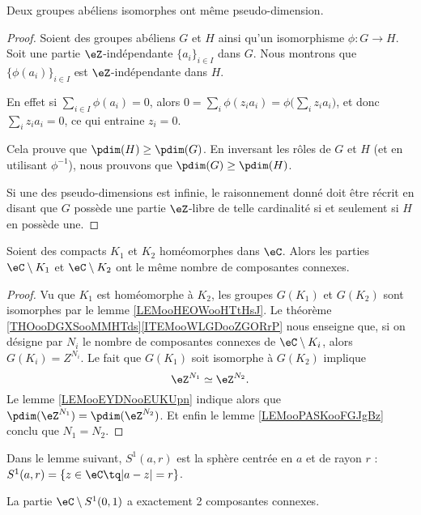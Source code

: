 \begin{lemma}		\label{LEMooEYDNooEUKUpn}
	Deux groupes abéliens isomorphes ont même pseudo-dimension.
\end{lemma}

\begin{proof}
	Soient des groupes abéliens \( G\) et \( H\) ainsi qu'un isomorphisme \(\phi \colon G\to H  \). Soit une partie \( \eZ\)-indépendante \( \{ a_i \}_{i\in I}\) dans \( G\). Nous montrons que \( \{ \phi(a_i) \}_{i\in I}\) est \( \eZ\)-indépendante dans \( H\).

	En effet si \( \sum_{i\in I}\phi(a_i)=0\), alors \( 0=\sum_i\phi(z_ia_i)=\phi\big( \sum_iz_ia_i \big)\), et donc \( \sum_iz_ia_i=0\), ce qui entraine \( z_i=0\).

	Cela prouve que \( \pdim(H)\geq\pdim(G)\). En inversant les rôles de \( G\) et \( H\) (et en utilisant \( \phi^{-1}\)), nous prouvons que \( \pdim(G)\geq \pdim(H)\).

	Si une des pseudo-dimensions est infinie, le raisonnement donné doit être récrit en disant que \( G\) possède une partie \( \eZ\)-libre de telle cardinalité si et seulement si \( H\) en possède une.
\end{proof}

\begin{corollary}		\label{CORooQNUIooKLtWVD}
	Soient des compacts \( K_1\) et \( K_2\) homéomorphes dans \( \eC\). Alors les parties \( \eC\setminus K_1\) et \( \eC\setminus K_2\) ont le même nombre de composantes connexes.
\end{corollary}

\begin{proof}
	Vu que \( K_1\) est homéomorphe à \( K_2\), les groupes \( G(K_1)\) et \( G(K_2)\) sont isomorphes par le lemme \ref{LEMooHEOWooHTtHsJ}. Le théorème \ref{THOooDGXSooMMHTds}\ref{ITEMooWLGDooZGORrP} nous enseigne que, si on désigne par \( N_i\) le nombre de composantes connexes de \( \eC\setminus K_i\), alors \( G(K_i)=Z^{N_i}\). Le fait que \( G(K_1)\) soit isomorphe à \( G(K_2)\) implique
	\begin{equation}
		\eZ^{N_1}\simeq \eZ^{N_2}.
	\end{equation}
	Le lemme \ref{LEMooEYDNooEUKUpn} indique alors que \( \pdim(\eZ^{N_1})=\pdim(\eZ^{N_2})\). Et enfin le lemme \ref{LEMooPASKooFGJgBz} conclu que \( N_1=N_2\).
\end{proof}

Dans le lemme suivant, \( S^1(a,r)\) est la sphère centrée en \( a\) et de rayon \( r\) : \( S^1(a,r)=\{ z\in \eC\tq | a-z |=r \}\).
\begin{lemma}
	La partie \( \eC\setminus S^1(0,1)\) a exactement 2 composantes connexes.
\end{lemma}

